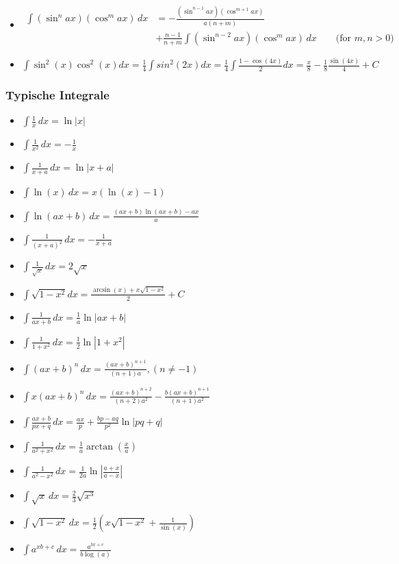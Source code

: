 \documentclass[25pt]{sciposter}
\begin{document}
\begin{multicols}{3}
\begin{itemize}
			\item $ {\displaystyle {\begin{aligned}\int (\sin ^{n}ax)(\cos ^{m}ax)\,dx&=-{\frac {(\sin ^{n-1}ax)(\cos ^{m+1}ax)}{a(n+m)}}\\&+{\frac {n-1}{n+m}}\int (\sin ^{n-2}ax)(\cos ^{m}ax)\,dx\qquad {\mbox{(for }}m,n>0{\mbox{)}}\end{aligned}}} $
			
			\item $\int \sin^2(x) \cos^2(x) dx = \frac{1}{4}\int sin^2(2x) dx = \frac{1}{4} \int \frac{1-\cos(4x)}{2}dx = \frac{x}{8} - \frac{1}{8} \frac{\sin(4x)}{4} + C$  
			
		\end{itemize}
		
		
		
		\subsubsection*{Typische Integrale}
		
		\begin{itemize}
			\item $\int \frac{1}{x} \,dx = \ln |x|$
			\item $\int \frac{1}{x^2} \,dx = -\frac{1}{x}$
			\item $\int \frac{1}{x+a} \,dx = \ln |x+a|$
			\item $\int \ln(x) \,dx = x(\ln(x) - 1)$
			\item $\int \ln(ax + b) \,dx = \frac{(a x+b) \ln (a x+b)-a x}{a}$
			\item $\int \frac{1}{(x+a)^2} \,dx = - \frac{1}{x+a}$
			\item $\int \frac{1}{\sqrt{x}} \,dx = 2 \sqrt{x}$
			\item $\int \sqrt{1-x^2} dx = \frac{\arcsin(x) + x \sqrt{1-x^2}}{2} + C$
			\item $\int \frac{1}{ax+b} \,dx = \frac{1}{a} \ln |ax+b|$
			\item $\int \frac{1}{1 + x^2} \,dx = \frac{1}{2} \ln |1 + x^2|$
			\item $\int(ax + b)^n \,dx = \frac{(ax + b)^{n+1}}{(n + 1)a}, (n \neq -1)$
			\item $\int x(ax+b)^n \,dx = \frac{(ax + b)^{n+2}}{(n+2)a^2} -
			\frac{b(ax+b)^{n+1}}{(n+1)a^2}$
			\item $\int \frac{ax + b}{px + q} \,dx = \frac{ax}{p} + \frac{bp - aq}{p^2} \ln
			|pq+q|$
			\item $\int \frac{1}{a^2 + x^2} \,dx = \frac{1}{a} \arctan(\frac{x}{a})$
			\item $\int \frac{1}{a^2 - x^2} \,dx = \frac{1}{2a} \ln \left | \frac{a+x}{a-x}
			\right |$
			\item $\int \sqrt{x} \,dx = \frac{2}{3}\sqrt{x^3}$
			\item $\int \sqrt{1-x^2} \,dx = \frac{1}{2}\left( x\sqrt{1-x^2}+\frac{1}{\sin(x)} \right)$
			\item $\int a^{xb + c} \,dx = \frac{a^{bx + c}}{b \log(a)}$
		\end{itemize}
		

\end{multicols}
\end{document}
